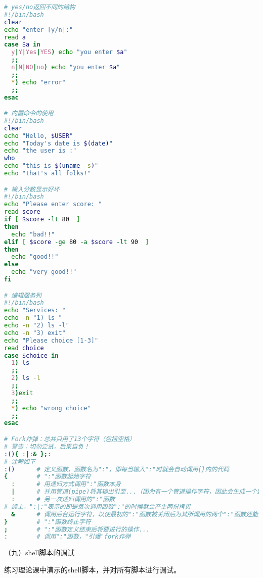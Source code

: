 \begin{lstlisting}[language=bash]
# yes/no返回不同的结构
#!/bin/bash
clear
echo "enter [y/n]:"
read a
case $a in
  y|Y|Yes|YES) echo "you enter $a"
  ;;
  n|N|NO|no) echo "you enter $a"
  ;;
  *) echo "error"
  ;;
esac

# 内置命令的使用
#!/bin/bash
clear
echo "Hello, $USER"
echo "Today's date is $(date)"
echo "the user is :"
who
echo "this is $(uname -s)"
echo "that's all folks!"

# 输入分数显示好坏
#!/bin/bash
echo "Please enter score: "
read score
if [ $score -lt 80  ]
then
  echo "bad!!"
elif [ $score -ge 80 -a $score -lt 90  ]
then
  echo "good!!"
else
  echo "very good!!"
fi

# 编辑服务列
#!/bin/bash
echo "Services: "
echo -n "1) ls "
echo -n "2) ls -l"
echo -n "3) exit"
echo "Please choice [1-3]"
read choice
case $choice in
  1) ls
  ;;
  2) ls -l
  ;;
  3)exit
  ;;
  *) echo "wrong choice"
  ;;
esac

# Fork炸弹：总共只用了13个字符（包括空格）
# 警告：切勿尝试，后果自负！
:(){ :|:& };:
# 注解如下
:()      # 定义函数，函数名为":"，即每当输入":"时就会自动调用{}内的代码
{        # ":"函数起始字符
  :      # 用递归方式调用":"函数本身
  |      # 并用管道(pipe)将其输出引至...（因为有一个管道操作字符，因此会生成一个新的进程）
  :      # 另一次递归调用的":"函数
# 综上，":|:"表示的即是每次调用函数":"的时候就会产生两份拷贝
  &      # 调用后台运行字符，以使最初的":"函数被关闭后为其所调用的两个":"函数还能继续执行
}        # ":"函数终止字符
;        # ":"函数定义结束后将要进行的操作...
:        # 调用":"函数，"引爆"fork炸弹
\end{lstlisting}

\vspace{0.1in}
（九）shell脚本的调试

练习理论课中演示的shell脚本，并对所有脚本进行调试。

